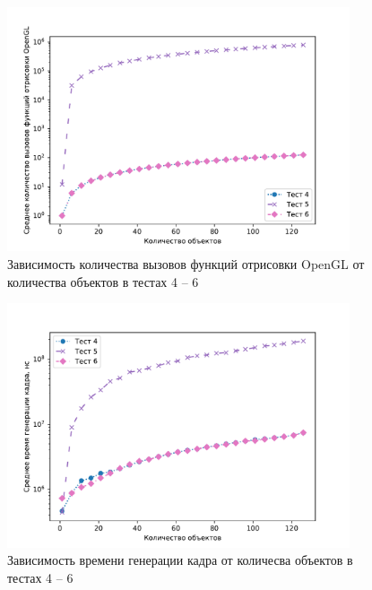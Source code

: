 \begin{figure}[H]
	\centering
    \includegraphics[width=0.9\textwidth]{img/456/plot_draw_calls.pdf}
	\caption{Зависимость количества вызовов функций отрисовки OpenGL от количества объектов в тестах 4 -- 6}
	\label{fig:456:dc}
\end{figure}

\begin{figure}[H]
	\centering
    \includegraphics[width=0.9\textwidth]{img/456/plot_time.pdf}
	\caption{Зависимость времени генерации кадра от количесва объектов в тестах 4 -- 6}
	\label{fig:456:time}
\end{figure}


